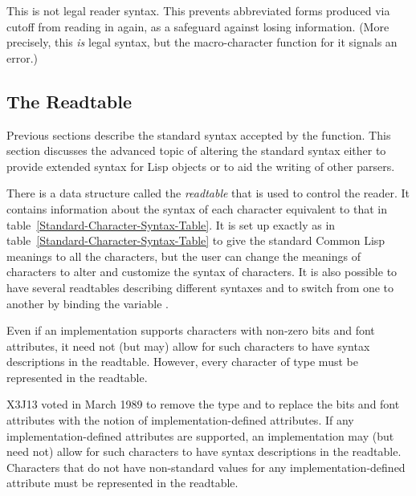 \begin{flushdesc}
\item[\cd{\#)}]
This is not legal reader syntax.
This prevents abbreviated forms produced via  cutoff
from reading in again, as a safeguard against losing information.
(More precisely, this \emph{is} legal syntax, but the macro-character
function for it signals an error.)
\end{flushdesc}

\subsection{The Readtable}
\label{READTABLE-SECTION}

Previous sections describe the standard syntax accepted by the 
function.  This section discusses the advanced topic of altering the
standard syntax either to provide extended syntax for Lisp objects
or to aid the writing of other parsers.

There is a data structure called the \emph{readtable} that is used to
control the reader.  It contains information about the syntax of each
character equivalent to that in table~\ref{Standard-Character-Syntax-Table}.
It is set up exactly as in
table~\ref{Standard-Character-Syntax-Table} to give the standard Common Lisp
meanings to all the characters, but the user can change the meanings of
characters to alter and customize the syntax of characters.  It is also
possible to have several readtables describing different syntaxes and to
switch from one to another by binding the variable .

\begin{obsolete}
Even if an implementation supports characters with non-zero bits and font attributes,
it need not (but may) allow for such characters to have syntax
descriptions in the readtable.  However, every character of type
 must be represented in the readtable.
\end{obsolete}

\begin{newer}
X3J13 voted in March 1989 
to remove the type  and to replace the bits and font attributes
with the notion of implementation-defined attributes.
If any implementation-defined attributes are supported, an implementation
may (but need not) allow for such characters to have syntax
descriptions in the readtable.  Characters that do not have non-standard values
for any implementation-defined attribute must be represented in the readtable.
\end{newer}

